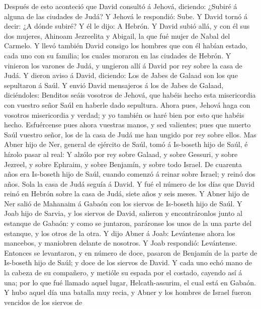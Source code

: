  Después de esto aconteció que David consultó á Jehová,
diciendo: ¿Subiré á alguna de las ciudades de Judá? Y Jehová le
respondió: Sube. Y David tornó á decir: ¿A dónde subiré? Y él le dijo: A
Hebrón.  Y David subió allá, y con él sus dos mujeres,
Ahinoam Jezreelita y Abigail, la que fué mujer de Nabal del Carmelo.
 Y llevó también David consigo los hombres que con él
habían estado, cada uno con su familia; los cuales moraron en las
ciudades de Hebrón.  Y vinieron los varones de Judá, y
ungieron allí á David por rey sobre la casa de Judá. Y dieron aviso á
David, diciendo: Los de Jabes de Galaad son los que sepultaron á Saúl.
 Y envió David mensajeros á los de Jabes de Galaad,
diciéndoles: Benditos seáis vosotros de Jehová, que habéis hecho esta
misericordia con vuestro señor Saúl en haberle dado sepultura.
 Ahora pues, Jehová haga con vosotros misericordia y
verdad; y yo también os haré bien por esto que habéis hecho.
 Esfuércense pues ahora vuestras manos, y sed valientes;
pues que muerto Saúl vuestro señor, los de la casa de Judá me han ungido
por rey sobre ellos.  Mas Abner hijo de Ner, general de
ejército de Saúl, tomó á Is-boseth hijo de Saúl, é hízolo pasar al real:
 Y alzólo por rey sobre Galaad, y sobre Gessuri, y sobre
Jezreel, y sobre Ephraim, y sobre Benjamín, y sobre todo Israel.
 De cuarenta años era Is-boseth hijo de Saúl, cuando
comenzó á reinar sobre Israel; y reinó dos años. Sola la casa de Judá
seguía á David.  Y fué el número de los días que David
reinó en Hebrón sobre la casa de Judá, siete años y seis meses.
 Y Abner hijo de Ner salió de Mahanaim á Gabaón con los
siervos de Is-boseth hijo de Saúl.  Y Joab hijo de
Sarvia, y los siervos de David, salieron y encontráronlos junto al
estanque de Gabaón: y como se juntaron, paráronse los unos de la una
parte del estanque, y los otros de la otra.  Y dijo Abner
á Joab: Levántense ahora los mancebos, y maniobren delante de nosotros.
Y Joab respondió: Levántense.  Entonces se levantaron, y
en número de doce, pasaron de Benjamín de la parte de Is-boseth hijo de
Saúl; y doce de los siervos de David.  Y cada uno echó
mano de la cabeza de su compañero, y metióle su espada por el costado,
cayendo así á una; por lo que fué llamado aquel lugar, Helcath-assurim,
el cual está en Gabaón.  Y hubo aquel día una batalla muy
recia, y Abner y los hombres de Israel fueron vencidos de los siervos de
